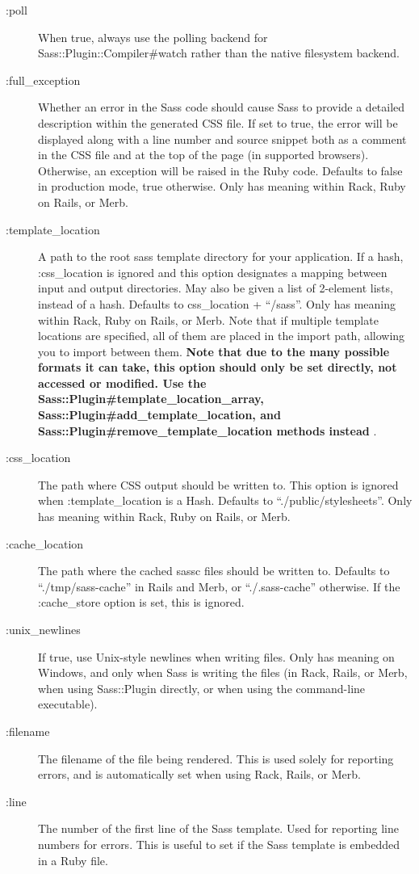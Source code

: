 \documentclass[9pt]{article}
\begin{document}
\begin{description}
\item[:poll]When true, always use the polling backend for Sass::Plugin::Compiler\#watch rather than the native filesystem backend.
\item[:full\_exception]Whether an error in the Sass code should cause Sass to provide a detailed description within the generated CSS file. If set to true, the error will be displayed along with a line number and source snippet both as a comment in the CSS file and at the top of the page (in supported browsers). Otherwise, an exception will be raised in the Ruby code. Defaults to false in production mode, true otherwise. Only has meaning within Rack, Ruby on Rails, or Merb.
\item[:template\_location]A path to the root sass template directory for your application. If a hash, :css\_location is ignored and this option designates a mapping between input and output directories. May also be given a list of 2-element lists, instead of a hash. Defaults to css\_location + ``/sass''. Only has meaning within Rack, Ruby on Rails, or Merb. Note that if multiple template locations are specified, all of them are placed in the import path, allowing you to import between them. \textbf{Note that due to the many possible formats it can take, this option should only be set directly, not accessed or modified. Use the Sass::Plugin\#template\_location\_array, Sass::Plugin\#add\_template\_location, and Sass::Plugin\#remove\_template\_location methods instead}
.
\item[:css\_location]The path where CSS output should be written to. This option is ignored when :template\_location is a Hash. Defaults to ``./public/stylesheets''. Only has meaning within Rack, Ruby on Rails, or Merb.
\item[:cache\_location]The path where the cached sassc files should be written to. Defaults to ``./tmp/sass-cache'' in Rails and Merb, or ``./.sass-cache'' otherwise. If the :cache\_store option is set, this is ignored.
\item[:unix\_newlines]If true, use Unix-style newlines when writing files. Only has meaning on Windows, and only when Sass is writing the files (in Rack, Rails, or Merb, when using Sass::Plugin directly, or when using the command-line executable).
\item[:filename]The filename of the file being rendered. This is used solely for reporting errors, and is automatically set when using Rack, Rails, or Merb.
\item[:line]The number of the first line of the Sass template. Used for reporting line numbers for errors. This is useful to set if the Sass template is embedded in a Ruby file.

\end{description}
\end{document}
